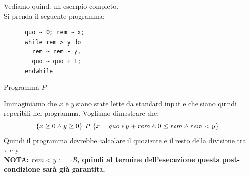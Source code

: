 				      				\begin{esempio}
				      					Vediamo quindi un esempio completo.\\
				      					Si prenda il seguente programma:
				      					\begin{listing}[H]
				      						\begin{lstlisting}
      quo ~ 0; rem ~ x;
      while rem > y do
        rem ~ rem - y;
        quo ~ quo + 1;
      endwhile  
				      						\end{lstlisting}
				      						\caption{Programma $P$}
				      						\label{E:W}
				      					\end{listing}
				      					Immaginiamo che $x$ e $y$ siano state lette da standard input e che siano quindi reperibili nel programma. Vogliamo dimostrare che:
				      					\[\{x\geq 0 \land y\geq 0\}\mbox{ \textit{P} }\{x=quo*y + rem \land 0 \leq rem \land rem < y\}\]
				      					Quindi il programma dovrebbe calcolare il quoziente e il resto della divisione tra x e y. \\ \textbf{NOTA: $ rem < y := \neg B $, quindi al termine dell'esecuzione questa post-condizione sarà già garantita.}

\end{esempio}
